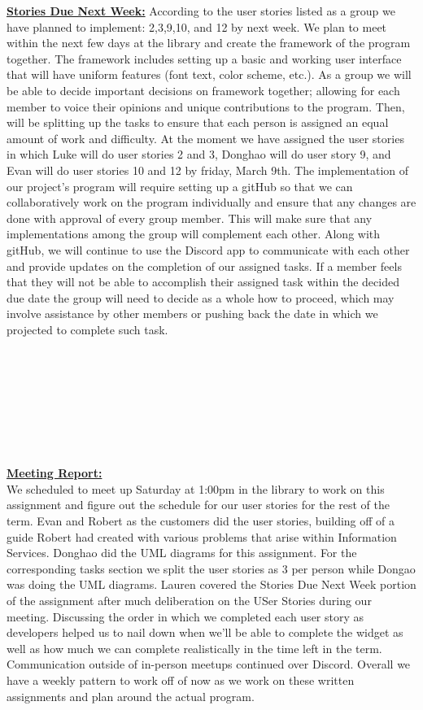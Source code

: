 \documentclass[12pt, letterpaper]{article}
\begin{document}
\underline{\textbf{Stories Due Next Week:}}
According to the user stories listed as a group we have planned to implement: 2,3,9,10, and 12 by next week.  We plan to meet within the next few days at the library and create the framework of the program together. The framework includes setting up a basic and working user interface that will have uniform features (font text, color scheme, etc.).  As a group we will be able to decide important decisions on framework together; allowing for each member to voice their opinions and unique contributions to the program.  Then, will be splitting up the tasks to ensure that each person is assigned an equal amount of work and difficulty.  At the moment we have assigned the user stories in which Luke will do user stories 2 and 3, Donghao will do user story 9, and Evan will do user stories 10 and 12 by friday, March 9th.
The implementation of our project’s program will require setting up a gitHub so that we can collaboratively work on the program individually and ensure that any changes are done with approval of every group member.  This will make sure that any implementations among the group will complement each other.  Along with gitHub, we will continue to use the Discord app to communicate with each other and provide updates on the completion of our assigned tasks.  If a member feels that they will not be able to accomplish their assigned task within the decided due date the group will need to decide as a whole how to proceed, which may involve assistance by other members or pushing back the date in which we projected to complete such task.
\\\\\\\\\\\\\\\\
\\\underline{\textbf{Meeting Report:}}
\\We scheduled to meet up Saturday at 1:00pm in the library to work on this assignment and figure out the schedule for our user stories for the rest of the term. Evan and Robert as the customers did the user stories, building off of a guide Robert had created with various problems that arise within Information Services. Donghao did the UML diagrams for this assignment. For the corresponding tasks section we split the user stories as 3 per person while Dongao was doing the UML diagrams. Lauren covered the Stories Due Next Week portion of the assignment after much deliberation on the USer Stories during our meeting. Discussing the order in which we completed each user story as developers helped us to nail down when we’ll be able to complete the widget as well as how much we can complete realistically in the time left in the term. Communication outside of in-person meetups continued over Discord. Overall we have a weekly pattern to work off of now as we work on these written assignments and plan around the actual program.
\end{document}
